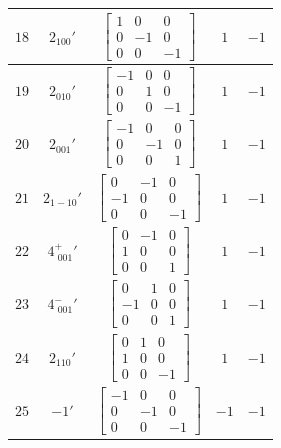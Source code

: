 \documentclass[fleqn,8pt]{jsarticle}
\begin{document}
\begin{longtable}{ccccc}
$ 18 $ & $ 2{}_{100}{}' $ & $ \begin{bmatrix} 1 & 0 & 0 \\ 0 & -1 & 0 \\ 0 & 0 & -1 \end{bmatrix} $ & $ 1 $ & $ -1 $ \\ \hline
$ 19 $ & $ 2{}_{010}{}' $ & $ \begin{bmatrix} -1 & 0 & 0 \\ 0 & 1 & 0 \\ 0 & 0 & -1 \end{bmatrix} $ & $ 1 $ & $ -1 $ \\ \hline
$ 20 $ & $ 2{}_{001}{}' $ & $ \begin{bmatrix} -1 & 0 & 0 \\ 0 & -1 & 0 \\ 0 & 0 & 1 \end{bmatrix} $ & $ 1 $ & $ -1 $ \\ \hline
$ 21 $ & $ 2{}_{1-10}{}' $ & $ \begin{bmatrix} 0 & -1 & 0 \\ -1 & 0 & 0 \\ 0 & 0 & -1 \end{bmatrix} $ & $ 1 $ & $ -1 $ \\ \hline
$ 22 $ & $ 4^{+}_{\,\,001}{}' $ & $ \begin{bmatrix} 0 & -1 & 0 \\ 1 & 0 & 0 \\ 0 & 0 & 1 \end{bmatrix} $ & $ 1 $ & $ -1 $ \\ \hline
$ 23 $ & $ 4^{-}_{\,\,001}{}' $ & $ \begin{bmatrix} 0 & 1 & 0 \\ -1 & 0 & 0 \\ 0 & 0 & 1 \end{bmatrix} $ & $ 1 $ & $ -1 $ \\ \hline
$ 24 $ & $ 2{}_{110}{}' $ & $ \begin{bmatrix} 0 & 1 & 0 \\ 1 & 0 & 0 \\ 0 & 0 & -1 \end{bmatrix} $ & $ 1 $ & $ -1 $ \\ \hline
$ 25 $ & $ -1{}' $ & $ \begin{bmatrix} -1 & 0 & 0 \\ 0 & -1 & 0 \\ 0 & 0 & -1 \end{bmatrix} $ & $ -1 $ & $ -1 $ \\ \hline

\end{longtable}
\end{document}
